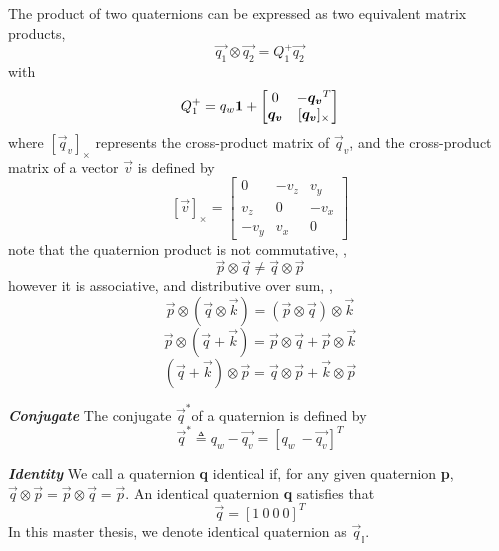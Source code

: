 The product of two quaternions can be expressed as two equivalent matrix products,
\begin{equation}\label{q4}
	\vec{q_1} \otimes \vec{q_2} = Q_1^+\vec{q_2}
\end{equation}
with
\begin{equation}\label{q5}
	Q_1^+ = q_w\mathbf{1} + \begin{bmatrix}
							  	0 &
							  	-\boldsymbol{q_v}^T\\
							  	\boldsymbol{q_v} &
							  	[\boldsymbol{q_v}]_\times
							  \end{bmatrix}
\end{equation}
where $[\vec{q}_v]_\times$ represents the cross-product matrix of $\vec{q}_v$, and the cross-product matrix of a vector $\vec{v}$ is defined by
\begin{equation} \label{q17}
	[\vec{v}]_\times =  \begin{bmatrix}
							0 & -v_z & v_y \\
							v_z & 0 & -v_x \\
							-v_y & v_x & 0 
						\end{bmatrix}
\end{equation}
note that the quaternion product is not commutative, \ie, 
\begin{equation}
	\vec{p} \otimes \vec{q} \neq \vec{q} \otimes \vec{p}
\end{equation}
however it is associative, and distributive over sum, \ie,
\begin{equation} \label{q26}
	\vec{p} \otimes (\vec{q} \otimes \vec{k}) = (\vec{p} \otimes \vec{q}) \otimes \vec{k}
\end{equation}
\begin{equation} \label{q27}
	\vec{p} \otimes (\vec{q} + \vec{k}) = \vec{p} \otimes \vec{q} + \vec{p} \otimes \vec{k}
\end{equation}
\begin{equation} \label{q28}
	(\vec{q} + \vec{k}) \otimes \vec{p} = \vec{q} \otimes \vec{p} + \vec{k} \otimes \vec{p}
\end{equation}

\textbf{\textit{Conjugate}} The conjugate $\vec{q}^*$of a quaternion is defined by
\begin{equation}\label{q6}
	\vec{q}^* \triangleq q_w - \vec{q_v} = \left[ q_w \ - \vec{q_v} \right]^T
\end{equation}

\textbf{\textit{Identity}} We call a quaternion \textbf{q} identical if, for any given quaternion \textbf{p}, $\vec{q} \otimes \vec{p} = \vec{p} \otimes \vec{q} = \vec{p}$. An identical quaternion \textbf{q} satisfies that
\begin{equation}\label{q8}
	\vec{q} = \left[1 \ 0 \ 0 \ 0 \right]^T
\end{equation}
In this master thesis, we denote identical quaternion as $\vec{q}_{\mathbb{I}}$.

